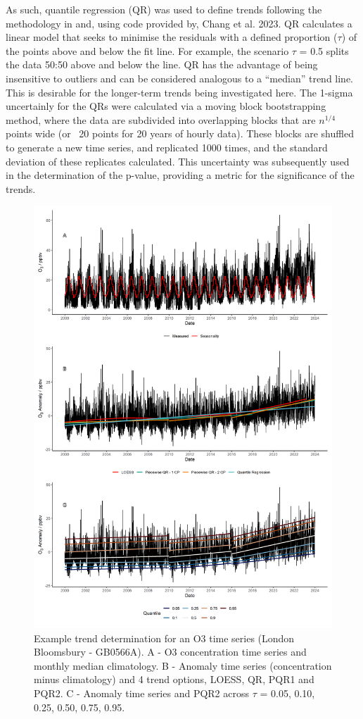 \documentclass[journal abbreviation, manuscript]{copernicus}
\begin{document}
As such, quantile regression (QR) was used to define trends following the methodology in and, using code provided by, Chang et al. 2023. QR calculates a linear model that seeks to minimise the residuals with a defined proportion ($\tau$) of the points above and below the fit line. For example, the scenario $\tau$ = 0.5 splits the data 50:50 above and below the line. QR has the advantage of being insensitive to outliers and can be considered analogous to a “median” trend line. This is desirable for the longer-term trends being investigated here. The 1-sigma uncertainly for the QRs were calculated via a moving block bootstrapping method, where the data are subdivided into overlapping blocks that are $n^{1/4}$ points wide (or ~20 points for 20 years of hourly data). These blocks are shuffled to generate a new time series, and replicated 1000 times, and the standard deviation of these replicates calculated. This uncertainty was subsequently used in the determination of the p-value, providing a metric for the significance of the trends. 


\begin{figure}[t]
\includegraphics[width=12cm]{plots/method.png}
\caption{Example trend determination for an O3 time series (London Bloomsbury - GB0566A). A - O3 concentration time series and monthly median climatology. B - Anomaly time series (concentration minus climatology) and 4 trend options, LOESS, QR, PQR1 and PQR2. C - Anomaly time series and PQR2 across $\tau$ = 0.05, 0.10, 0.25, 0.50, 0.75, 0.95.}
\label{method_plot}
\end{figure}
\end{document}
